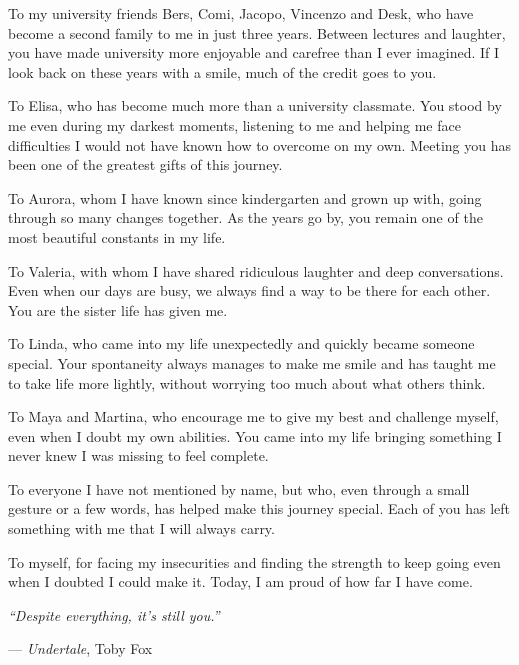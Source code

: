 To my university friends Bers, Comi, Jacopo, Vincenzo and Desk,
who have become a second family to me in just three years.
Between lectures and laughter, you have made university
more enjoyable and carefree than I ever imagined.
If I look back on these years with a smile,
much of the credit goes to you.

To Elisa,
who has become much more than a university classmate.
You stood by me even during my darkest moments,
listening to me and helping me face difficulties
I would not have known how to overcome on my own.
Meeting you has been one of the greatest gifts
of this journey.

To Aurora,
whom I have known since kindergarten and grown up with,
going through so many changes together.
As the years go by, you remain one of the most
beautiful constants in my life.

To Valeria,
with whom I have shared ridiculous laughter and
deep conversations. Even when our days are busy,
we always find a way to be there for each other.
You are the sister life has given me.

To Linda,
who came into my life unexpectedly and quickly
became someone special. Your spontaneity always
manages to make me smile and has taught me to take
life more lightly, without worrying too much
about what others think.

To Maya and Martina,
who encourage me to give my best and challenge myself,
even when I doubt my own abilities.
You came into my life bringing something
I never knew I was missing to feel complete.

To everyone I have not mentioned by name,
but who, even through a small gesture or a few words,
has helped make this journey special.
Each of you has left something with me
that I will always carry.

To myself,
for facing my insecurities and finding the strength
to keep going even when I doubted I could make it.
Today, I am proud of how far I have come.

\vspace*{\fill}

\begin{flushright}
    \begin{minipage}{0.75\textwidth}
        \raggedleft
        \textit{``Despite everything, it's still you.''}

        \vspace{0.2cm}

        --- \textit{Undertale}, Toby Fox
    \end{minipage}
\end{flushright}
\endgroup